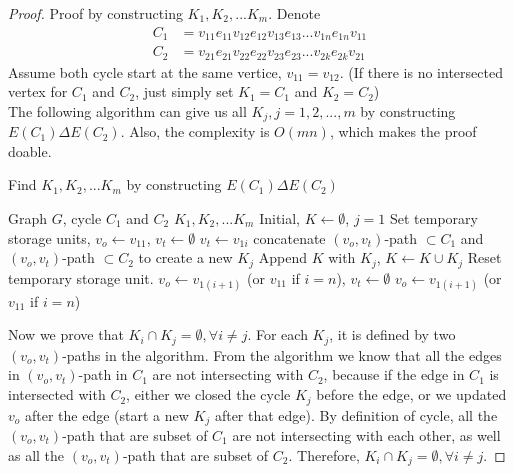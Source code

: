                 \begin{proof}
                    Proof by constructing $K_1, K_2, ... K_m$. Denote 
                    \begin{align*}
                        C_1 & = v_{11}e_{11}v_{12}e_{12}v_{13}e_{13}...v_{1n}e_{1n}v_{11}\\
                        C_2 & = v_{21}e_{21}v_{22}e_{22}v_{23}e_{23}...v_{2k}e_{2k}v_{21}
                    \end{align*}
                    Assume both cycle start at the same vertice, $v_{11} = v_{12}$. (If there is no intersected vertex for $C_1$ and $C_2$, just simply set $K_1 = C_1$ and $K_2 = C_2$)\\
                    The following algorithm can give us all $K_j, j=1, 2, ... , m$ by constructing $E(C_1)\Delta E(C_2)$.  Also, the complexity is $O(mn)$, which makes the proof doable.\\
                    \begin{algorithm}[H]
                        \caption{Find $K_1, K_2, ... K_m$ by constructing $E(C_1)\Delta E(C_2)$}
                        \begin{algorithmic}[1]
                            \Require Graph $G$, cycle $C_1$ and $C_2$
                            \Ensure $K_1, K_2, ... K_m$
                            \State Initial, $K \gets \emptyset$, $j = 1$
                            \State Set temporary storage units, $v_o \gets v_{11}$, $v_t \gets \emptyset$
                                        \State $v_t \gets v_{1i}$
                                        \State concatenate $(v_o, v_t)$-path $\subset C_1$ and $(v_o, v_t)$-path $\subset C_2$ to create a new $K_j$
                                        \State Append $K$ with $K_j$, $K \gets K \cup K_j$
                                        \State Reset temporary storage unit. $v_o \gets v_{1(i+1)}$ (or $v_{11}$ if $i = n$), $v_t \gets \emptyset$
                                    \Else
                                        \State $v_o \gets v_{1(i+1)}$ (or $v_{11}$ if $i = n$)
                                    \EndIf
                                \EndIf
                            \EndFor
                        \end{algorithmic}
                    \end{algorithm}
                    Now we prove that $K_i\cap K_j = \emptyset, \forall i \ne j$. For each $K_j$, it is defined by two $(v_o, v_t)$-paths in the algorithm. From the algorithm we know that all the edges in $(v_o, v_t)$-path in $C_1$ are not intersecting with $C_2$, because if the edge in $C_1$ is intersected with $C_2$, either we closed the cycle $K_j$ before the edge, or we updated $v_o$ after the edge (start a new $K_j$ after that edge). By definition of cycle, all the $(v_o, v_t)$-path that are subset of $C_1$ are not intersecting with each other, as well as all the $(v_o, v_t)$-path that are subset of $C_2$. Therefore, $K_i\cap K_j = \emptyset, \forall i \ne j$.
                \end{proof}

